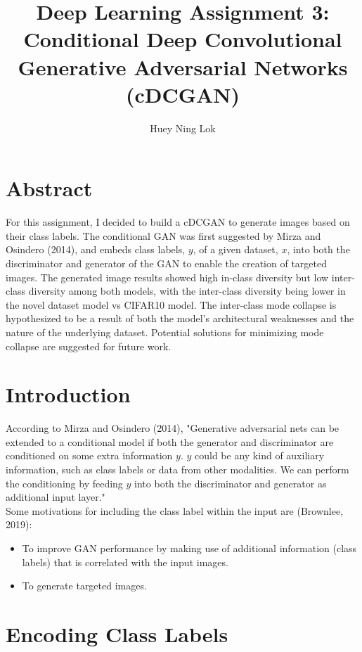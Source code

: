 \documentclass[11pt]{article}
\title{Deep Learning Assignment 3: Conditional Deep Convolutional Generative Adversarial Networks (cDCGAN)}
\author{Huey Ning Lok}
\begin{document}
    
    
    \maketitle


\section{Abstract}\label{abstract}

For this assignment, I decided to build a cDCGAN to
generate images based on their class labels. The conditional GAN was
first suggested by Mirza and Osindero (2014), and embeds class labels,
\(y\), of a given dataset, \(x\), into both the discriminator and
generator of the GAN to enable the creation of targeted images. The
generated image results showed high in-class diversity but low
inter-class diversity among both models, with the inter-class diversity
being lower in the novel dataset model vs CIFAR10 model. The 
inter-class mode collapse is hypothesized to be a result of both the model's architectural weaknesses and the nature of the underlying dataset. Potential solutions for minimizing mode collapse are suggested for future work.

\section{Introduction}\label{introduction}

According to Mirza and Osindero (2014), "Generative adversarial nets can
be extended to a conditional model if both the generator and
discriminator are conditioned on some extra information \(y\). \(y\)
could be any kind of auxiliary information, such as class labels or data
from other modalities. We can perform the conditioning by feeding \(y\)
into both the discriminator and generator as additional input layer."\\

Some motivations for including the class label within the input are
(Brownlee, 2019):

\begin{itemize}
\item
  To improve GAN performance by making use of additional information
  (class labels) that is correlated with the input images.
\item
  To generate targeted images.
\end{itemize}

\section{Encoding Class Labels}\label{encoding-class-labels}
\end{document}
